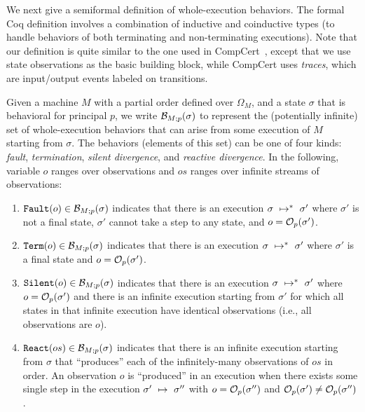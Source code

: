 \noindent
We next give a semiformal definition of whole-execution behaviors. 
The formal Coq definition involves a
combination of inductive and coinductive types (to handle behaviors of
both terminating and non-terminating executions). Note that our 
definition is quite similar to the one used in CompCert~\cite{Leroy-backend},
except that we use state observations as the basic building block, while 
CompCert uses \emph{traces}, which are input/output events labeled on 
transitions.
\begin{definition}
Given a machine $M$ with a partial order defined over $\Omega_M$,
and a state $\sigma$ that is behavioral for 
principal $p$, we write $\mathcal{B}_{M;p}(\sigma)$ to represent the (potentially 
infinite) set of whole-execution behaviors that can arise from some execution 
of $M$ starting from $\sigma$. The behaviors (elements of this set) can 
be one of four kinds: \emph{fault}, \emph{termination}, \emph{silent divergence},
and \emph{reactive divergence}. In the following, variable $o$ ranges over 
observations and $os$ ranges over infinite streams of observations:
\begin{enumerate}
\item $\text{\tt{Fault}}(o) \in \mathcal{B}_{M;p}(\sigma)$ indicates that there
is an execution $\sigma~\mapsto^*~\sigma'$ where $\sigma'$ is not
a final state, $\sigma'$ cannot take a step to any state, and 
$o = \mathcal{O}_{p}(\sigma')$.
\item $\text{\tt{Term}}(o) \in \mathcal{B}_{M;p}(\sigma)$ indicates that there
is an execution $\sigma~\mapsto^*~\sigma'$ where $\sigma'$ is 
a final state and $o = \mathcal{O}_{p}(\sigma')$.
\item $\text{\tt{Silent}}(o) \in \mathcal{B}_{M;p}(\sigma)$ indicates that there
is an execution $\sigma~\mapsto^*~\sigma'$ where $o = \mathcal{O}_{p}(\sigma')$
and there is an infinite execution starting from $\sigma'$ for which all
states in that infinite execution have identical observations (i.e., all
observations are $o$).
\item $\text{\tt{React}}(os) \in \mathcal{B}_{M;p}(\sigma)$ indicates that there
is an infinite execution starting from $\sigma$ that ``produces'' each of the
infinitely-many observations of $os$ in order. An observation $o$ is ``produced'' 
in an execution when there exists some single step in the execution 
$\sigma'~\mapsto~\sigma''$ with $o = \mathcal{O}_{p}(\sigma'')$ and 
$\mathcal{O}_{p}(\sigma') \neq \mathcal{O}_{p}(\sigma'')$.
\end{enumerate}
\end{definition}


